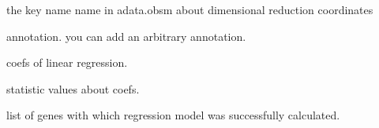 \documentclass[letterpaper,10pt,english]{sphinxmanual}
\begin{document}
\begin{fulllineitems}
\begin{fulllineitems}
\end{fulllineitems}


\begin{fulllineitems}
\label{\detokenize{modules/celloracle:celloracle.Net.embedding_name}}
 \textendash{} the key name name in adata.obsm about dimensional reduction coordinates

\end{fulllineitems}


\begin{fulllineitems}
\label{\detokenize{modules/celloracle:celloracle.Net.annotation}}
 \textendash{} annotation. you can add an arbitrary annotation.

\end{fulllineitems}


\begin{fulllineitems}
\label{\detokenize{modules/celloracle:celloracle.Net.coefs_dict}}
 \textendash{} coefs of linear regression.

\end{fulllineitems}


\begin{fulllineitems}
\label{\detokenize{modules/celloracle:celloracle.Net.stats_dict}}
 \textendash{} statistic values about coefs.

\end{fulllineitems}


\begin{fulllineitems}
\label{\detokenize{modules/celloracle:celloracle.Net.fitted_genes}}
 \textendash{} list of genes with which regression model was successfully calculated.


\end{fulllineitems}
\end{fulllineitems}
\end{document}
